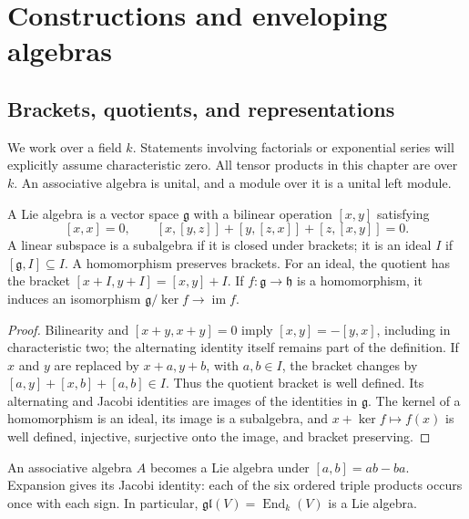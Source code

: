\chapter{Constructions and enveloping algebras}
\label{ch:constructions}

\section{Brackets, quotients, and representations}

We work over a field \(k\). Statements involving factorials or exponential
series will explicitly assume characteristic zero. All tensor products
in this chapter are over \(k\). An associative algebra is unital, and a
module over it is a unital left module.

\begin{definition}\label{res:A01}
A Lie algebra is a vector space \(\mathfrak g\) with a bilinear operation
\([x,y]\) satisfying
\[
 [x,x]=0,\qquad
 [x,[y,z]]+[y,[z,x]]+[z,[x,y]]=0.
\]
A linear subspace is a subalgebra if it is closed under brackets; it is
an ideal \(I\) if \([\mathfrak g,I]\subseteq I\). A homomorphism preserves
brackets. For an ideal, the quotient has the bracket
\([x+I,y+I]=[x,y]+I\). If \(f:\mathfrak g\to\mathfrak h\) is a
homomorphism, it induces an isomorphism
\(\mathfrak g/\ker f\longrightarrow\operatorname{im}f\).
\end{definition}

\begin{proof}
Bilinearity and \([x+y,x+y]=0\) imply \([x,y]=-[y,x]\), including in
characteristic two; the alternating identity itself remains part of the
definition. If \(x\) and \(y\) are replaced by \(x+a,y+b\), with
\(a,b\in I\), the bracket changes by
\([a,y]+[x,b]+[a,b]\in I\). Thus the quotient bracket is well defined.
Its alternating and Jacobi identities are images of the identities
in \(\mathfrak g\). The kernel of a homomorphism is an ideal, its image
is a subalgebra, and \(x+\ker f\mapsto f(x)\) is well defined, injective,
surjective onto the image, and bracket preserving.
\end{proof}

An associative algebra \(A\) becomes a Lie algebra under
\([a,b]=ab-ba\). Expansion gives its Jacobi identity: each of the six
ordered triple products occurs once with each sign. In particular,
\(\mathfrak{gl}(V)=\operatorname{End}_k(V)\) is a Lie algebra.


